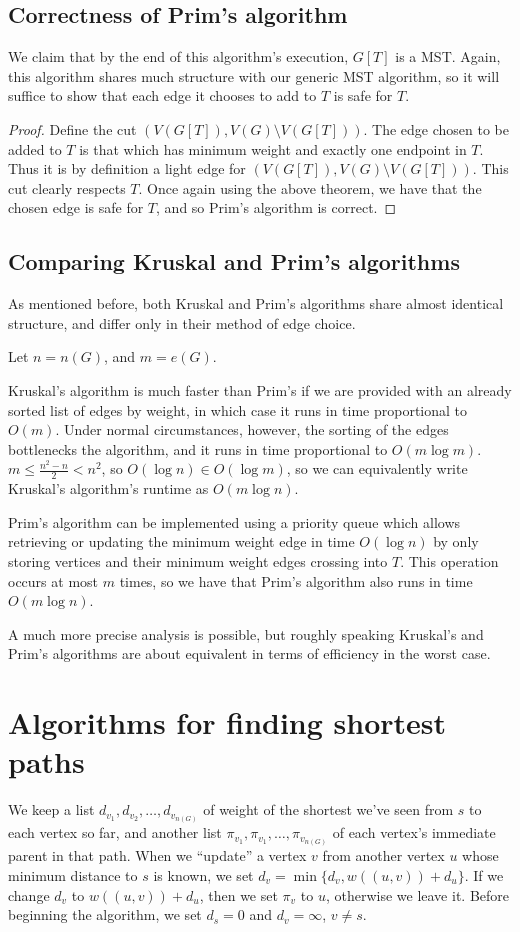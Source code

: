 \documentclass[11pt]{article}
\begin{document}
\subsection{Correctness of Prim's algorithm}
We claim that by the end of this algorithm's execution, $G[T]$ is a MST. Again,
this algorithm shares much structure with our generic MST algorithm, so it will
suffice to show that each edge it chooses to add to $T$ is safe for $T$.
\begin{proof}
	Define the cut $(V(G[T]), V(G)\setminus V(G[T]))$. The edge chosen to be
	added to $T$ is that which has minimum weight and exactly one endpoint in
	$T$. Thus it is by definition a light edge for
	$(V(G[T]), V(G)\setminus V(G[T]))$. This cut clearly respects $T$. Once
	again using the above theorem, we have that the chosen edge is safe for
	$T$, and so Prim's algorithm is correct.\cite{CLRS}
\end{proof}


\subsection{Comparing Kruskal and Prim's algorithms}
As mentioned before, both Kruskal and Prim's algorithms share almost identical
structure, and differ only in their method of edge choice.

Let $n=n(G)$, and $m=e(G)$.

Kruskal's algorithm is much faster than Prim's if we are provided with an
already sorted list of edges by weight, in which case it runs in time
proportional to $O(m)$. Under normal circumstances, however, the sorting
of the edges bottlenecks the algorithm, and it runs in time proportional to
$O(m\log m)$. $m\le\frac{n^2-n}{2}<n^2$, so
$O(\log n)\in O(\log m)$, so we can equivalently write Kruskal's
algorithm's runtime as $O(m\log n)$.\cite{CLRS}

Prim's algorithm can be implemented using a priority queue which allows
retrieving or updating the minimum weight edge in time $O(\log n)$ by only
storing vertices and their minimum weight edges crossing into $T$. This
operation occurs at most $m$ times, so we have that Prim's algorithm also
runs in time $O(m\log n)$.\cite{CLRS}

A much more precise analysis is possible, but roughly speaking Kruskal's and
Prim's algorithms are about equivalent in terms of efficiency in the worst
case.


\section{Algorithms for finding shortest paths}
We keep a list $d_{v_1},d_{v_2},\ldots,d_{v_{n(G)}}$ of weight of the shortest
we've seen from $s$ to each vertex so far, and another list
$\pi_{v_1},\pi_{v_1},\ldots,\pi_{v_{n(G)}}$ of each vertex's immediate parent
in that path. When we ``update'' a vertex $v$ from another vertex $u$ whose
minimum distance to $s$ is known, we set $d_v=\min\{d_v,w((u,v))+d_u\}$. If
we change $d_v$ to $w((u,v))+d_u$, then we set $\pi_v$ to $u$, otherwise we
leave it. Before beginning the algorithm, we set $d_s=0$ and $d_v=\infty$,
$v\neq s$.
\end{document}
